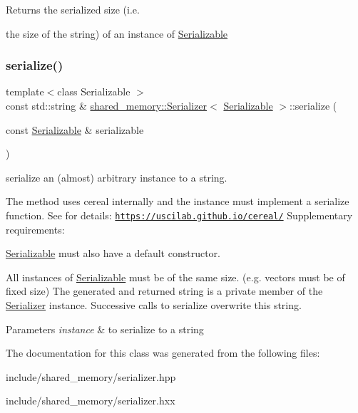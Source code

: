 Returns the serialized size (i.\+e. 

the size of the string) of an instance of \hyperlink{classSerializable}{Serializable} \mbox{\label{classshared__memory_1_1Serializer_a61ea01a0e5e28fc24c9274455050b1c1}} 
\subsubsection{\texorpdfstring{serialize()}{serialize()}}
{\footnotesize\ttfamily template$<$class Serializable $>$ \\
const std\+::string \& \hyperlink{classshared__memory_1_1Serializer}{shared\+\_\+memory\+::\+Serializer}$<$ \hyperlink{classSerializable}{Serializable} $>$\+::serialize (\begin{DoxyParamCaption}\item[{const \hyperlink{classSerializable}{Serializable} \&}]{serializable }\end{DoxyParamCaption})}



serialize an (almost) arbitrary instance to a string. 

The method uses cereal internally and the instance must implement a serialize function. See for details\+: \href{https://uscilab.github.io/cereal/}{\tt https\+://uscilab.\+github.\+io/cereal/} Supplementary requirements\+:
\begin{DoxyItemize}
\item \hyperlink{classSerializable}{Serializable} must also have a default constructor.
\item All instances of \hyperlink{classSerializable}{Serializable} must be of the same size. (e.\+g. vectors must be of fixed size) The generated and returned string is a private member of the \hyperlink{classshared__memory_1_1Serializer}{Serializer} instance. Successive calls to serialize overwrite this string. 
\begin{DoxyParams}{Parameters}
{\em instance} & to serialize to a string \\
\hline
\end{DoxyParams}

\end{DoxyItemize}

The documentation for this class was generated from the following files\+:\begin{DoxyCompactItemize}
\item 
include/shared\+\_\+memory/serializer.\+hpp\item 
include/shared\+\_\+memory/serializer.\+hxx\end{DoxyCompactItemize}
